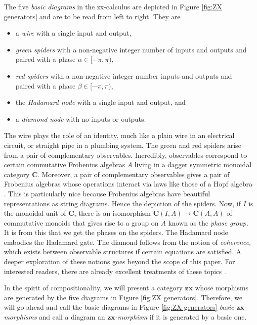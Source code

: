\documentclass[]{amsart}
\theoremstyle{defn}
\begin{document}
The five \emph{basic diagrams} in the zx-calculus are depicted in Figure \ref{fig:ZX generators} and are to be read from left to right. They are
\begin{itemize}
	\item a \emph{wire} with a single input and output,
	\item \emph{green spiders} with a non-negative integer number of inputs and outputs and paired with a phase $\alpha \in [-\pi,\pi)$,
	\item \emph{red spiders} with a non-negative integer number inputs and outputs and paired with a phase $\beta \in [-\pi,\pi)$,
	\item the \emph{Hadamard node} with a single input and output, and
	\item a \emph{diamond node} with no inputs or outputs.
\end{itemize}
The wire plays the role of an identity, much like a plain wire in an electrical circuit, or straight pipe in a plumbing system. The green and red spiders arise from a pair of complementary observables.  Incredibly, observables correspond to certain commutative Frobenius algebras $A$ living in a dagger symmetric monoidal category $\mathbf{C}$. Moreover, a pair of complementary observables gives a pair of Frobenius algebras whose operations interact via laws like those of a Hopf algebra \cite{CoeckePavlovic_QuantumMeasSums, CoeckePavVicary_OrthBasis}.  This is particularly nice because Frobenius algebras have beautiful representations as string diagrams. Hence the depiction of the spiders. Now, if $I$ is the monoidal unit of $\mathbf{C}$, there is an isomorphism $\mathbf{C}(I,A) \to \mathbf{C}(A,A)$ of commutative monoids that gives rise to a group on $A$ known as the \emph{phase group}.  It is from this that we get the phases on the spiders. The Hadamard node embodies the Hadamard gate. The diamond follows from the notion of \emph{coherence}, which exists between observable structures if certain equations are satisfied.  A deeper exploration of these notions goes beyond the scope of this paper.  For interested readers, there are already excellent treatments of these topics \cite{CoeckeDuncan_QuantumObsFullPaper}.

In the spirit of compositionality, we will present a category $\mathbf{zx}$ whose morphisms are generated by the five diagrams in Figure \ref{fig:ZX generators}. Therefore, we will go ahead and call the basic diagrams in Figure \ref{fig:ZX generators} \emph{basic $\mathbf{zx}$-morphisms} and call a diagram an \emph{$\mathbf{zx}$-morphism} if it is generated by a basic one.
\end{document}
